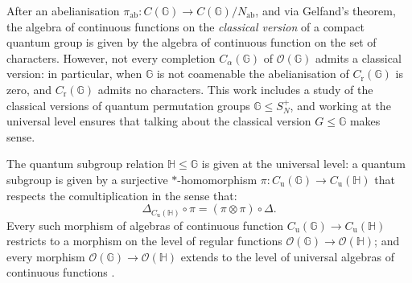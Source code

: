 \documentclass[12pt]{amsart}
\theoremstyle{remark}
\theoremstyle{remark}
\begin{document}
\bigskip

After an abelianisation $\pi_{\text{ab}}:C(\mathbb{G})\to C(\mathbb{G})/N_{\text{ab}}$, and via Gelfand's theorem, the algebra of continuous functions on the \emph{classical version} of a compact quantum group is  given by the algebra of continuous function on the set of characters. However, not  every completion $C_\alpha(\mathbb{G})$ of $\mathcal{O}(\mathbb{G})$ admits a classical version: in particular, when $\mathbb{G}$ is not coamenable the abelianisation of $C_{\text{r}}(\mathbb{G})$ is zero, and $C_{\text{r}}(\mathbb{G})$ admits no characters. This work includes a study of the classical versions of  quantum permutation groups $\mathbb{G}\leq S_N^+$, and working at the universal level ensures that talking about the classical version $G\leq \mathbb{G}$ makes sense.

      \bigskip

The quantum subgroup relation $\mathbb{H}\leq \mathbb{G}$ is given at the universal level: a quantum subgroup is given by a surjective $\ast$-homomorphism $\pi: C_{\text{u}}(\mathbb{G})\to C_{\text{u}}(\mathbb{H})$ that respects the comultiplication in the sense that:
$$\Delta_{C_{\text{u}}(\mathbb{H})}\circ\pi=(\pi\otimes \pi)\circ \Delta.$$
Every such morphism of algebras of continuous function  $C_{\text{u}}(\mathbb{G})\to C_{\text{u}}(\mathbb{H})$ restricts to a  morphism on the level of regular functions $\mathcal{O}(\mathbb{G})\to \mathcal{O}(\mathbb{H})$; and every  morphism $\mathcal{O}(\mathbb{G})\to \mathcal{O}(\mathbb{H})$ extends to the level of universal algebras of continuous functions \cite{bmt}.

\bigskip
\end{document}
